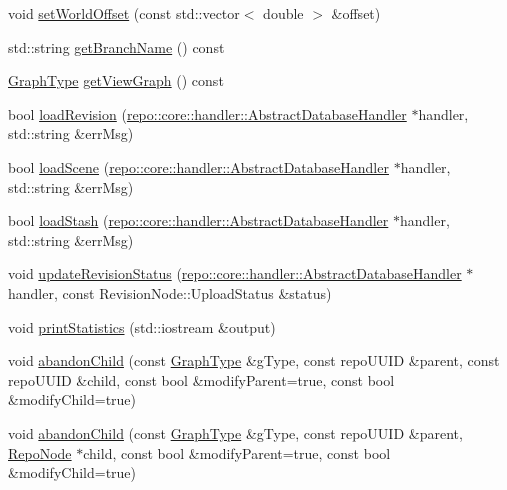 \begin{DoxyCompactItemize}
void \hyperlink{classrepo_1_1core_1_1model_1_1_repo_scene_a617eb9c5266a174cf6f9f0a41dfb115e}{set\+World\+Offset} (const std\+::vector$<$ double $>$ \&offset)
\item 
std\+::string \hyperlink{classrepo_1_1core_1_1model_1_1_repo_scene_a045fd45a5c75176bb193a470f0fcf618}{get\+Branch\+Name} () const 
\item 
\hyperlink{classrepo_1_1core_1_1model_1_1_repo_scene_aefcacd6eb4c7774ac1bfe3a6b223337c}{Graph\+Type} \hyperlink{classrepo_1_1core_1_1model_1_1_repo_scene_a740ff35cf44e9a39a068bdc4a1353cf0}{get\+View\+Graph} () const 
\item 
bool \hyperlink{classrepo_1_1core_1_1model_1_1_repo_scene_a383afae13ad7cd1b64302191b0e4cdd7}{load\+Revision} (\hyperlink{classrepo_1_1core_1_1handler_1_1_abstract_database_handler}{repo\+::core\+::handler\+::\+Abstract\+Database\+Handler} $\ast$handler, std\+::string \&err\+Msg)
\item 
bool \hyperlink{classrepo_1_1core_1_1model_1_1_repo_scene_aae5c18cc8197d8fcd26cc252e4ef9dcc}{load\+Scene} (\hyperlink{classrepo_1_1core_1_1handler_1_1_abstract_database_handler}{repo\+::core\+::handler\+::\+Abstract\+Database\+Handler} $\ast$handler, std\+::string \&err\+Msg)
\item 
bool \hyperlink{classrepo_1_1core_1_1model_1_1_repo_scene_a6affae3bf21f89793b98e883bc084298}{load\+Stash} (\hyperlink{classrepo_1_1core_1_1handler_1_1_abstract_database_handler}{repo\+::core\+::handler\+::\+Abstract\+Database\+Handler} $\ast$handler, std\+::string \&err\+Msg)
\item 
void \hyperlink{classrepo_1_1core_1_1model_1_1_repo_scene_ac85354a3447d62bfc8aad76c5e51d187}{update\+Revision\+Status} (\hyperlink{classrepo_1_1core_1_1handler_1_1_abstract_database_handler}{repo\+::core\+::handler\+::\+Abstract\+Database\+Handler} $\ast$handler, const Revision\+Node\+::\+Upload\+Status \&status)
\item 
void \hyperlink{classrepo_1_1core_1_1model_1_1_repo_scene_addb2548a816916c09d57a9ff5cb54aea}{print\+Statistics} (std\+::iostream \&output)
\item 
void \hyperlink{classrepo_1_1core_1_1model_1_1_repo_scene_aa35a3fdeec65b4ce71b50291cb6732e4}{abandon\+Child} (const \hyperlink{classrepo_1_1core_1_1model_1_1_repo_scene_aefcacd6eb4c7774ac1bfe3a6b223337c}{Graph\+Type} \&g\+Type, const repo\+U\+U\+I\+D \&parent, const repo\+U\+U\+I\+D \&child, const bool \&modify\+Parent=true, const bool \&modify\+Child=true)
\item 
void \hyperlink{classrepo_1_1core_1_1model_1_1_repo_scene_abbcb804184b739134a091c2893b350a5}{abandon\+Child} (const \hyperlink{classrepo_1_1core_1_1model_1_1_repo_scene_aefcacd6eb4c7774ac1bfe3a6b223337c}{Graph\+Type} \&g\+Type, const repo\+U\+U\+I\+D \&parent, \hyperlink{classrepo_1_1core_1_1model_1_1_repo_node}{Repo\+Node} $\ast$child, const bool \&modify\+Parent=true, const bool \&modify\+Child=true)

\end{DoxyCompactItemize}
